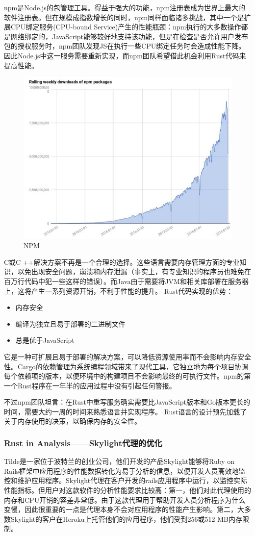 \documentclass[12pt, a4paper]{article}
\begin{document}
		
		npm是Node.js的包管理工具。得益于强大的功能，npm注册表成为世界上最大的软件注册表。但在规模成指数增长的同时，npm同样面临诸多挑战，其中一个是扩展CPU绑定服务(CPU-bound Service)产生的性能瓶颈：npm执行的大多数操作都是网络绑定的，JavaScript能够较好地支持该功能，但是在检查是否允许用户发布包的授权服务时，npm团队发现JS在执行一些CPU绑定任务时会造成性能下降。因此Node.js中这一服务需要重新实现，而npm团队希望借此机会利用Rust代码来提高性能。
		\begin{figure}[H]
			\centering
			\includegraphics[width=0.7\linewidth]{Z1}
			\caption{NPM}
			\label{fig:southeast}
		\end{figure}
		C或C ++解决方案不再是一个合理的选择。这些语言需要内存管理方面的专业知识，以免出现安全问题，崩溃和内存泄漏（事实上，有专业知识的程序员也难免在百万行代码中犯一些这样的错误）。而Java由于需要将JVM和相关库部署在服务器上，这将产生一系列资源开销，不利于性能的提升。
		Rust代码实现的优势：
		\begin{itemize} 
		\item 内存安全
		\item 编译为独立且易于部署的二进制文件
		\item 总是优于JavaScript
		\end{itemize}
		它是一种可扩展且易于部署的解决方案，可以降低资源使用率而不会影响内存安全性。Cargo的依赖管理为系统编程领域带来了现代工具，它独立地为每个项目协调每个依赖项的版本，以便环境中的构建项目不会影响最终的可执行文件。npm的第一个Rust程序在一年半的应用过程中没有引起任何警报。
		
		不过npm团队坦言：在Rust中重写服务确实需要比JavaScript版本和Go版本更长的时间，需要大约一周的时间来熟悉语言并实现程序。 Rust语言的设计预先加载了关于内存使用的决策，以确保内存的安全性。

		\subsubsection{Rust in Analysis——Skylight代理的优化}
		Tilde是一家位于波特兰的创业公司，他们开发的产品Skylight能够将Ruby on Rails框架中应用程序的性能数据转化为易于分析的信息，以便开发人员高效地监控和维护应用程序。Skylight代理在客户开发的rails应用程序中运行，以监控实际性能指标。但用户对这款软件的分析性能要求比较高：第一，他们对此代理使用的内存和CPU开销的容差非常低。由于这款代理用于帮助开发人员分析程序为什么变慢，因此很重要的一点是代理本身不会对应用程序的性能产生影响。第二，大多数Skylight的客户在Heroku上托管他们的应用程序，他们受到256或512 MB内存限制。
		
\end{document}

